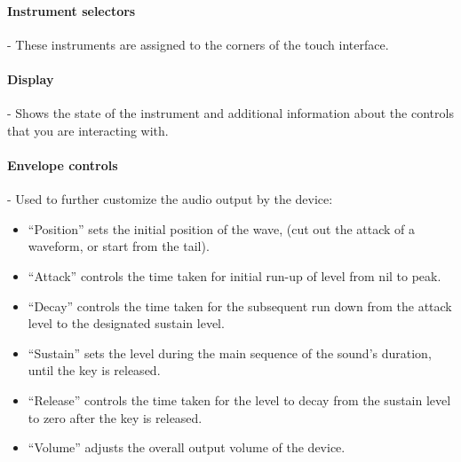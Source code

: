 \begin{figure}[h]
\centering \small
{}
\vspace{-2em}
\end{figure}

\paragraph{Instrument selectors} - These instruments are assigned to the corners of the touch interface.

\paragraph{Display} - Shows the state of the instrument and additional information about the controls that you are interacting with.

\paragraph{Envelope controls} - Used to further customize the audio output by the device:
\begin{itemize}
\item ``Position'' sets the initial position of the wave, (cut out the attack of a waveform, or start from the tail).
\item ``Attack'' controls the time taken for initial run-up of level from nil to peak.
\item ``Decay'' controls the time taken for the subsequent run down from the attack level to the designated sustain level.
\item ``Sustain'' sets the level during the main sequence of the sound's duration, until the key is released.
\item ``Release'' controls the time taken for the level to decay from the sustain level to zero after the key is released.
\item ``Volume'' adjusts the overall output volume of the device.
\end{itemize}


